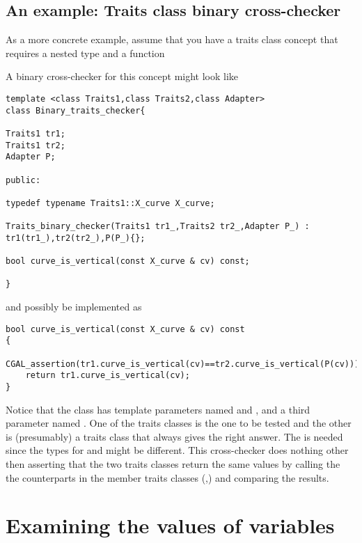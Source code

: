 \subsection*{An example: Traits class binary cross-checker}

As a more concrete example, assume that you have a traits class concept 
that requires a nested type  and a function


A binary cross-checker for this concept might look like 
\begin{verbatim}
template <class Traits1,class Traits2,class Adapter>
class Binary_traits_checker{

Traits1 tr1;
Traits1 tr2;
Adapter P;

public:

typedef typename Traits1::X_curve X_curve;

Traits_binary_checker(Traits1 tr1_,Traits2 tr2_,Adapter P_) :
tr1(tr1_),tr2(tr2_),P(P_){};

bool curve_is_vertical(const X_curve & cv) const;

}
\end{verbatim}

and possibly be implemented as 

\begin{verbatim}
bool curve_is_vertical(const X_curve & cv) const
{
    CGAL_assertion(tr1.curve_is_vertical(cv)==tr2.curve_is_vertical(P(cv)));
    return tr1.curve_is_vertical(cv);
}
\end{verbatim}

Notice that the class  has template parameters 
named  and , and a third parameter named 
. One of the traits classes is the one to be tested and the
other is (presumably) a traits class that always gives the right answer.
The  is needed since the  types 
for  and  might be different. 
This cross-checker does nothing other then asserting that the two traits 
classes return the same values by calling the 
the counterparts in the member traits classes 
(,) and comparing the results.


\section{Examining the values of variables}
\label{sec:debugging_handles_and_it}


